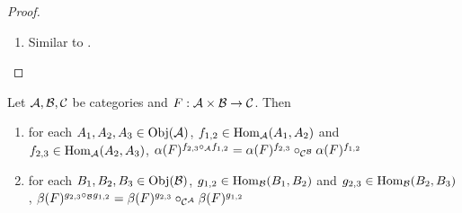 \documentclass{book}
\begin{document}
\begin{proof}
\begin{enumerate}
\begin{itemize}
\begin{align*}
					& = F(f, \id_{B_2}^{\MB}) \circ_{\MC} F(\id_{A_1}^{\MA}, g) \\
					& = \al(F)^f_{B_2} \circ_{\MC} F(A_1, \cdot)(g),
				\end{align*} 
				i.e. the following diagram commutes:
				\[
				\begin{tikzcd}
					F(A_1, \cdot)(B_1)  \arrow[r, "{\al(F)^f_{B_1}}"] \arrow[d, "{F(A_1, \cdot)(g)}"'] & F(A_2, \cdot)(B_1) \arrow[d, "{F(A_2, \cdot)(g)}"] \\
					F(A_1, \cdot)(B_2) \arrow[r, "{\al(F)^f_{B_2}}"] &  F(A_2, \cdot)(B_2).
				\end{tikzcd}
				\]
				Since $B_1, B_2 \in \Obj(\MB)$ and $g \in \Hom_{\MB}(B_1, B_2)$ are arbitrary, we have that for each $B_1, B_2 \in \Obj(\MB)$ and $g \in \Hom_{\MB}(B_1, B_2)$, $F(A_2, \cdot)(g) \circ_{\MC} \al(F)^f_{B_1} = \al(F)^f_{B_2} \circ_{\MC} F(A_1, \cdot)(g)$.
			\end{itemize}
			Thus $\al(F)^f:F(A_1, \cdot) \Rightarrow F(A_2, \cdot)$ is a natural transformation. Since $A_1, A_2 \in \Obj(\MA)$ and $f \in \Hom_{\MA}(A_1, A_2)$ are arbitrary, we have that for each $A_1, A_2 \in \Obj(\MA)$ and $f \in \Hom_{\MA}(A_1, A_2)$, $\al(F)^f:F(A_1, \cdot) \Rightarrow F(A_2, \cdot)$ is a natural transformation.
			\item Similar to .
		\end{enumerate}
	\end{proof}
	
	\begin{ex} 
		Let $\mathcal{A}, \mathcal{B}, \mathcal{C}$ be categories and $F :\mathcal{A} \times \mathcal{B} \rightarrow \mathcal{C}$. Then
		\begin{enumerate}
			\item for each $A_1, A_2, A_3 \in \operatorname{Obj}(\mathcal{A})$, $f_{1,2} \in \operatorname{Hom}_{\mathcal{A}}(A_1, A_2)$ and $f_{2,3} \in \operatorname{Hom}_{\mathcal{A}}(A_2, A_3)$, $\alpha(F)^{f_{2,3} \circ_{\mathcal{A}} f_{1,2}} = \alpha(F)^{f_{2,3}} \circ_{\mathcal{C}^{\mathcal{B}}} \alpha(F)^{f_{1,2}} $
			\item for each $B_1, B_2, B_3 \in \operatorname{Obj}(\mathcal{B})$, $g_{1,2} \in \operatorname{Hom}_{\mathcal{B}}(B_1, B_2)$ and $g_{2,3} \in \operatorname{Hom}_{\mathcal{B}}(B_2, B_3)$, $\beta(F)^{g_{2,3} \circ_{\mathcal{B}} g_{1,2}} = \beta(F)^{g_{2,3}} \circ_{\mathcal{C}^{\mathcal{A}}} \beta(F)^{g_{1,2}}$
		\end{enumerate}
	\end{ex}
	
\end{document}
